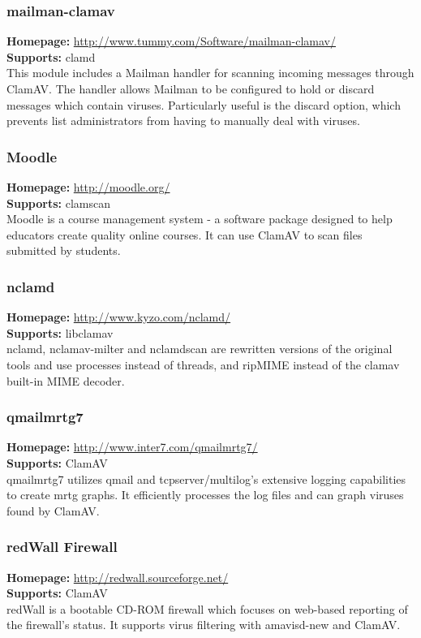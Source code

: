 \documentclass[a4paper,titlepage,12pt]{article}
\begin{document}
    \subsubsection{mailman-clamav}
    \textbf{Homepage:} \url{http://www.tummy.com/Software/mailman-clamav/}\\
    \textbf{Supports:} clamd\\[4pt]
    This module includes a Mailman handler for scanning incoming messages
    through ClamAV. The handler allows Mailman to be configured to hold or
    discard messages which contain viruses. Particularly useful is the
    discard option, which prevents list administrators from having to
    manually deal with viruses.

    \subsubsection{Moodle}
    \textbf{Homepage:} \url{http://moodle.org/}\\
    \textbf{Supports:} clamscan\\[4pt]
    Moodle is a course management system - a software package designed to help
    educators create quality online courses. It can use ClamAV to scan files
    submitted by students.

    \subsubsection{nclamd}
    \textbf{Homepage:} \url{http://www.kyzo.com/nclamd/}\\
    \textbf{Supports:} libclamav\\[4pt]
    nclamd, nclamav-milter and nclamdscan are rewritten versions of the
    original tools and use processes instead of threads, and ripMIME instead
    of the clamav built-in MIME decoder.

    \subsubsection{qmailmrtg7}
    \textbf{Homepage:} \url{http://www.inter7.com/qmailmrtg7/}\\
    \textbf{Supports:} ClamAV\\[4pt]
    qmailmrtg7 utilizes qmail and tcpserver/multilog's extensive logging
    capabilities to create mrtg graphs. It efficiently processes the log
    files and can graph viruses found by ClamAV.

    \subsubsection{redWall Firewall}
    \textbf{Homepage:} \url{http://redwall.sourceforge.net/}\\
    \textbf{Supports:} ClamAV\\[4pt]
    redWall is a bootable CD-ROM firewall which focuses on web-based
    reporting of the firewall's status. It supports virus filtering with
    amavisd-new and ClamAV.
\end{document}
